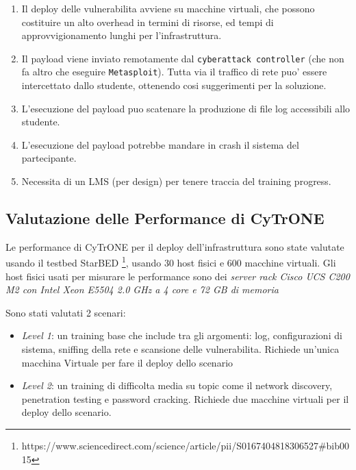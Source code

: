 \begin{enumerate}
\def\labelenumi{\arabic{enumi}.}
\tightlist
\item
  Il deploy delle vulnerabilita avviene su macchine virtuali, che
  possono costituire un alto overhead in termini di risorse, ed tempi di
  approvvigionamento lunghi per l'infrastruttura.
\item
  Il payload viene inviato remotamente dal
  \passthrough{\lstinline!cyberattack controller!} (che non fa altro che
  eseguire \passthrough{\lstinline!Metasploit!}). Tutta via il traffico
  di rete puo' essere intercettato dallo studente, ottenendo cosi
  suggerimenti per la soluzione.
\item
  L'esecuzione del payload puo scatenare la produzione di file log
  accessibili allo studente.
\item
  L'esecuzione del payload potrebbe mandare in crash il sistema del
  partecipante.
\item
  Necessita di un LMS (per design) per tenere traccia del training
  progress.
\end{enumerate}

\subsection{Valutazione delle Performance di
CyTrONE}\label{valutazione-delle-performance-di-cytrone}

Le performance di CyTrONE per il deploy dell'infrastruttura sono state
valutate usando il testbed StarBED \footnote{\label{fn:ref_10}https://www.sciencedirect.com/science/article/pii/S0167404818306527\#bib0015},
usando 30 host fisici e 600 macchine virtuali. Gli host fisici usati per
misurare le performance sono dei \emph{server rack Cisco UCS C200 M2 con
Intel Xeon E5504 2.0 GHz a 4 core e 72 GB di memoria}

Sono stati valutati 2 scenari:

\begin{itemize}
\tightlist
\item
  \emph{Level 1}: un training base che include tra gli argomenti: log,
  configurazioni di sistema, sniffing della rete e scansione delle
  vulnerabilita. Richiede un'unica macchina Virtuale per fare il deploy
  dello scenario
\item
  \emph{Level 2}: un training di difficolta media su topic come il
  network discovery, penetration testing e password cracking. Richiede
  due macchine virtuali per il deploy dello scenario.
\end{itemize}

